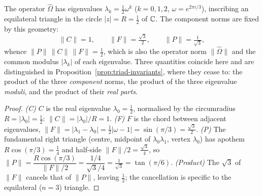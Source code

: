 \begin{proposition}\label{prop:pcf-norms}
The operator $\hat\Omega$ has eigenvalues $\lambda_k=\tfrac12\omega^{k}$
($k=0,1,2$, $\omega=e^{2\pi i/3}$), inscribing an equilateral triangle in the
circle $|z|=R=\tfrac12$ of $\mathbb{C}$. The component norms are fixed by this geometry:
\begin{equation}\label{eq:norms-derived}
\|C\|=1,\qquad \|F\|=\tfrac{\sqrt3}{2},\qquad \|P\|=\tfrac{1}{\sqrt3},
\end{equation}
whence $\|P\|\,\|C\|\,\|F\|=\tfrac12$, which is also the operator norm $\|\hat\Omega\|$ and the
common modulus $|\lambda_k|$ of each eigenvalue. Three quantities coincide here and are
distinguished in Proposition~\ref{prop:triad-invariants}, where they cease to: the product of
the three \emph{component} norms, the product of the three eigenvalue \emph{moduli}, and the
product of their \emph{real parts}.

\end{proposition}
\begin{proof}
\emph{(C)} $C$ is the real eigenvalue $\lambda_0=\tfrac12$, normalised by the
circumradius $R=|\lambda_0|=\tfrac12$: $\|C\|=|\lambda_0|/R=1$.
\emph{(F)} $F$ is the chord between adjacent eigenvalues,
$\|F\|=|\lambda_1-\lambda_0|=\tfrac12|\omega-1|=\sin(\pi/3)=\tfrac{\sqrt3}{2}$.
\emph{(P)} The fundamental right triangle (centre, midpoint of
$\lambda_0\lambda_1$, vertex $\lambda_0$) has apothem $R\cos(\pi/3)=\tfrac14$ and
half-side $\|F\|/2=\tfrac{\sqrt3}{4}$, so
$\|P\|=\dfrac{R\cos(\pi/3)}{\|F\|/2}=\dfrac{1/4}{\sqrt3/4}=\tfrac{1}{\sqrt3}=\tan(\pi/6)$.
\emph{(Product)} The $\sqrt3$ of $\|F\|$ cancels that of $\|P\|$, leaving $\tfrac12$;
the cancellation is specific to the equilateral ($n{=}3$) triangle.
\end{proof}
